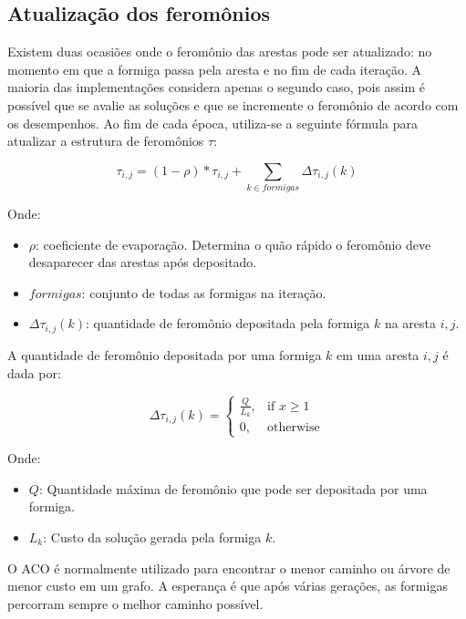 \subsection{Atualização dos feromônios}
Existem duas ocasiões onde o feromônio das arestas pode ser atualizado: no momento em que a formiga passa pela aresta e no fim de cada iteração. A maioria das implementações considera apenas o segundo caso, pois assim é possível que se avalie as soluções e que se incremente o feromônio de acordo com os desempenhos. Ao fim de cada época, utiliza-se a seguinte fórmula para atualizar a estrutura de feromônios $\tau$:

\[ \tau_{i,j} = (1 - \rho) * \tau_{i,j} + \sum_{k \in formigas} \Delta\tau_{i,j}(k)\]

Onde:

\begin{itemize}  
	\item $\rho$: coeficiente de evaporação. Determina o quão rápido o feromônio deve desaparecer das arestas após depositado.
	\item $formigas$: conjunto de todas as formigas na iteração.
	\item $\Delta\tau_{i,j}(k)$: quantidade de feromônio depositada pela formiga $k$ na aresta $i,j$.
\end{itemize}

A quantidade de feromônio depositada por uma formiga $k$ em uma aresta $i,j$ é dada por:

\[ \Delta\tau_{i,j}(k) = \begin{cases} \frac{Q}{L_k},& \text{if } x\geq 1\\ 0,& \text{otherwise} \end{cases} \]

Onde:

\begin{itemize}  
	\item $Q$: Quantidade máxima de feromônio que pode ser depositada por uma formiga.
	\item $L_k$: Custo da solução gerada pela formiga  $k$.
\end{itemize}

O ACO é normalmente utilizado para encontrar o menor caminho ou árvore de menor custo em um grafo. A esperança é que após várias gerações, as formigas percorram sempre o melhor caminho possível.


